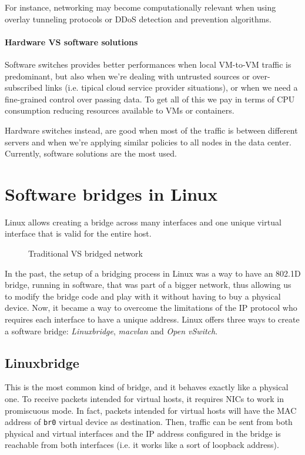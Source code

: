 \begin{note}
    For instance, networking may become computationally relevant when using
    overlay tunneling protocols or DDoS detection and prevention algorithms.
\end{note}

\paragraph{Hardware VS software solutions}
Software switches provides better performances when local VM-to-VM traffic is
predominant, but also when we're dealing with untrusted sources or over-subscribed
links (i.e. tipical cloud service provider situations), or when we need a
fine-grained control over passing data. To get all of this we pay in terms of
CPU consumption reducing resources available to VMs or containers.

Hardware switches instead, are good when most of the traffic is between different
servers and when we're applying similar policies to all nodes in the data center.
Currently, software solutions are the most used.

\section{Software bridges in Linux}
Linux allows creating a bridge across many interfaces and one unique virtual
interface that is valid for the entire host.

\begin{figure}[h!]
    \centering
    \hspace{1.5cm}
    \caption{Traditional VS bridged network}
\end{figure}

\noindent
In the past, the setup of a bridging process in Linux was a way to have an 802.1D
bridge, running in software, that was part of a bigger network, thus allowing
us to modify the bridge code and play with it without having to buy a physical
device. Now, it became a way to overcome the limitations of the IP protocol who
requires each interface to have a unique address. Linux offers three ways to
create a software bridge: \emph{Linuxbridge}, \emph{macvlan} and \emph{Open
vSwitch}.

\subsection{Linuxbridge}
This is the most common kind of bridge, and it behaves exactly like a physical
one. To receive packets intended for virtual hosts, it requires NICs to work in
promiscuous mode. In fact, packets intended for virtual hosts will have the MAC
address of \texttt{br0} virtual device as destination. Then, traffic can be
sent from both physical and virtual interfaces and the IP address configured in
the bridge is reachable from both interfaces (i.e. it works like a sort of
loopback address).

